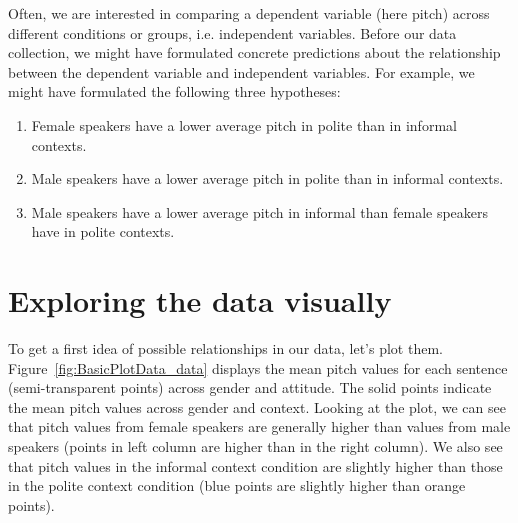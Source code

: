 \documentclass[nobib]{tufte-handout}
\begin{document}
Often, we are interested in comparing a dependent variable (here pitch) across different
conditions or groups, i.e. independent variables. Before our data collection, we might have
formulated concrete predictions about the relationship between the dependent variable and
independent variables. For example, we might have formulated the following three
hypotheses:

\begin{enumerate}[{H}1:]
\item Female speakers have a lower average pitch in polite than in informal contexts.
\item Male speakers have a lower average pitch in polite than in informal contexts.
\item Male speakers have a lower average pitch in informal than female speakers have in polite contexts.
\end{enumerate}

\section{Exploring the data visually}

To get a first idea of possible relationships in our data, let's plot
them. Figure~\ref{fig:BasicPlotData_data} displays the mean pitch values for each
sentence (semi-transparent points) across gender and attitude. The solid points indicate the
mean pitch values across gender and context. Looking at the plot, we can see that pitch values
from female speakers are generally higher than values from male speakers (points in left column
are higher than in the right column). We also see that pitch values in the informal context
condition are slightly higher than those in the polite context condition (blue points are
slightly higher than orange points).
\end{document}
